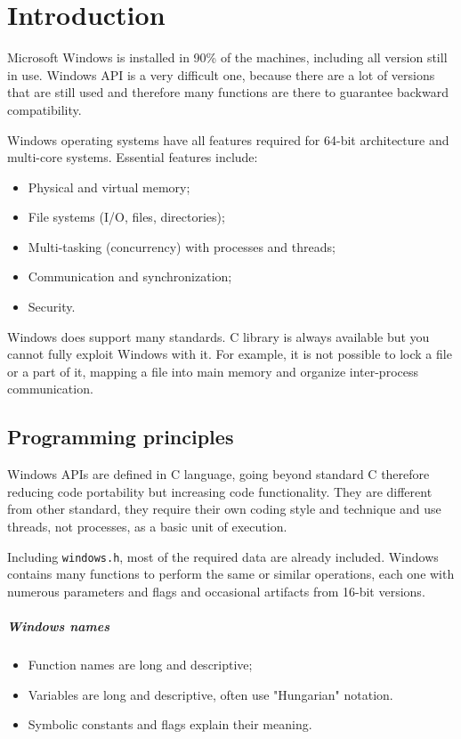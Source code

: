 \chapter{Introduction}
Microsoft Windows is installed in 90\% of the machines, including all version still in use. Windows API is a very difficult one, because there are a lot of versions that are still used and therefore many functions are there to guarantee backward compatibility.

Windows operating systems have all features required for 64-bit architecture and multi-core systems. Essential features include:
\begin{itemize}
\item Physical and virtual memory;
\item File systems (I/O, files, directories);
\item Multi-tasking (concurrency) with processes and threads;
\item Communication and synchronization;
\item Security.
\end{itemize}
Windows does support many standards. C library is always available but you cannot fully exploit Windows with it. For example, it is not possible to lock a file or a part of it, mapping a file into main memory and organize inter-process communication.

\section{Programming principles}
Windows APIs are defined in C language, going beyond standard C therefore reducing code portability but increasing code functionality. They are different from other standard, they require their own coding style and technique and use threads, not processes, as a basic unit of execution.

Including \texttt{windows.h}, most of the required data are already included. Windows contains many functions to perform the same or similar operations, each one with numerous parameters and flags and occasional artifacts from 16-bit versions.

\paragraph{Windows names}
\begin{itemize}
\item Function names are long and descriptive;
\item Variables are long and descriptive, often use "Hungarian" notation.
\item Symbolic constants and flags explain their meaning.
\end{itemize}

